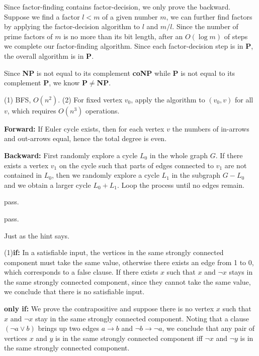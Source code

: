 
\ex Since factor-finding contains factor-decision, we only prove the backward.
Suppose we find a factor $l<m$ of a given number $m$, we can further find factors by applying the factor-decision algorithm to $l$ and $m/l$.
Since the number of prime factors of $m$ is no more than its bit length, after an $O(\log m)$ of steps we complete our factor-finding algorithm.
Since each factor-decision step is in $\bm{P}$, the overall algorithm is in $\bm{P}$.

\ex Since \textbf{NP} is not equal to its complement \textbf{coNP} while \textbf{P} is not equal to its complement \textbf{P}, we know \textbf{P}$\neq$\textbf{NP}.

\ex (1) BFS, $O(n^2)$. (2) For fixed vertex $v_0$, apply the algorithm to $(v_0,v)$ for all $v$, which requires $O(n^3)$ operations.

\ex \textbf{Forward:} If Euler cycle exists, then for each vertex $v$ the numbers of in-arrows and out-arrows equal, hence the total degree is even.

\textbf{Backward:} First randomly explore a cycle $L_0$ in the whole graph $G$.
If there exists a vertex $v_1$ on the cycle such that parts of edges connected to $v_1$ are not contained in $L_0$, then we randomly explore a cycle $L_1$ in the subgraph $G-L_0$ and we obtain a larger cycle $L_0+L_1$.
Loop the process until no edges remain. \redstar

\ex pass.

\ex pass.

\ex Just as the hint says.

\ex (1)\textbf{if:} In a satisfiable input, the vertices in the same strongly connected component must take the same value, otherwise there exists an edge from 1 to 0, which corresponds to a false clause.
If there exists $x$ such that $x$ and $\neg x$ stays in the same strongly connected component, since they cannot take the same value, we conclude that there is no satisfiable input.

\textbf{only if:} We prove the contrapositive and suppose there is no vertex $x$ such that $x$ and $\neg x$ stay in the same strongly connected component.
Noting that a clause $(\neg a\vee b)$ brings up two edges $a\rightarrow b$ and $\neg b\rightarrow\neg a$, we conclude that any pair of vertices $x$ and $y$ is in the same strongly connected component iff $\neg x$ and $\neg y$ is in the same strongly connected component.

